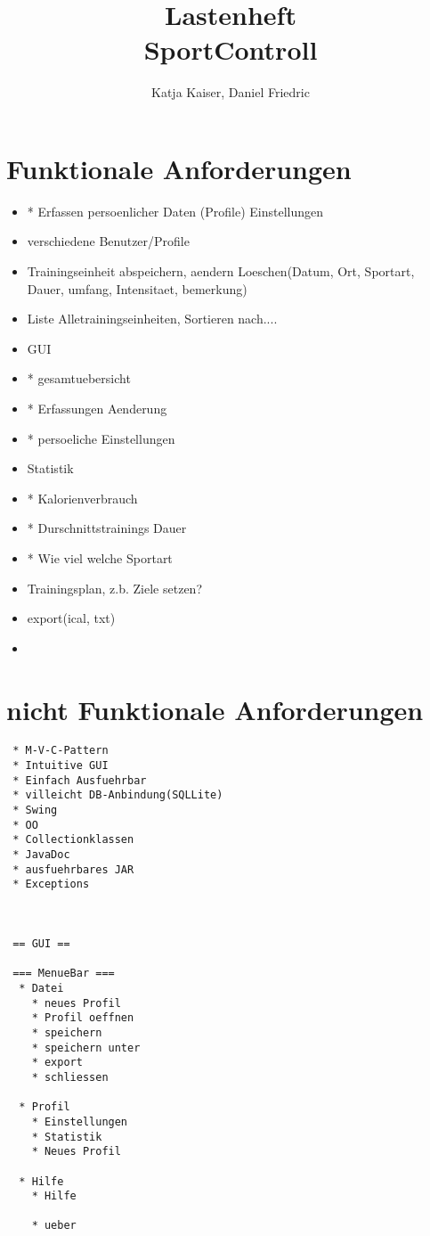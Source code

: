 \documentclass[12pt,a4paper]{article}
\author{Katja Kaiser, Daniel Friedric}
\title{Lastenheft \\ SportControll}
\begin{document}
\maketitle



\section{Funktionale Anforderungen}
\begin{itemize}

\item* Erfassen persoenlicher Daten (Profile) Einstellungen
\item verschiedene Benutzer/Profile
\item Trainingseinheit abspeichern, aendern Loeschen(Datum, Ort, Sportart, Dauer, umfang, Intensitaet, bemerkung)
\item Liste Alletrainingseinheiten, Sortieren nach....
\item GUI 
	
	\item 	* gesamtuebersicht
 	\item  * Erfassungen Aenderung
	\item 	* persoeliche Einstellungen
\item  Statistik
	 \item	* Kalorienverbrauch
	 \item	* Durschnittstrainings Dauer
	 \item	* Wie viel welche Sportart
 	 
\item Trainingsplan, z.b. Ziele setzen?
\item export(ical, txt)
\item 
\end{itemize} 





\section{nicht Funktionale Anforderungen}
\begin{verbatim}
 * M-V-C-Pattern
 * Intuitive GUI
 * Einfach Ausfuehrbar
 * villeicht DB-Anbindung(SQLLite)
 * Swing
 * OO
 * Collectionklassen
 * JavaDoc
 * ausfuehrbares JAR
 * Exceptions
 
 
 
 == GUI ==
 
 === MenueBar ===
  * Datei
    * neues Profil
  	* Profil oeffnen
  	* speichern
  	* speichern unter
  	* export
  	* schliessen
  	
  * Profil
  	* Einstellungen
  	* Statistik
  	* Neues Profil
  	
  * Hilfe
  	* Hilfe

  	* ueber
  	
  	\end{verbatim}
\end{document}
